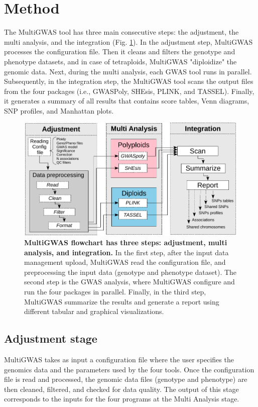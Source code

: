 \documentclass{article}
\begin{document}
\section{Method}

The MultiGWAS tool has three main consecutive steps: the adjustment, the multi analysis, and the integration (Fig. \ref{fig: Pipeline}). In the adjustment step, MultiGWAS processes the configuration file. Then it cleans and filters the genotype and phenotype datasets, and in case of tetraploids,  MultiGWAS "diploidize" the genomic data. Next, during the multi analysis, each GWAS tool runs in parallel. Subsequently, in the integration step, the MultiGWAS tool scans the output files from the four packages (i.e., GWASPoly, SHEsis, PLINK, and TASSEL). Finally, it generates a summary of all results that contains score tables, Venn diagrams, SNP profiles, and Manhattan plots. 
\begin{figure}
\centering{}\includegraphics[width=12cm]{02_figure-multiGWAS-flowchart-stages} \caption{\textbf{MultiGWAS flowchart has three steps: adjustment, multi analysis, and integration.} In the first step, after the input data management upload, MultiGWAS read the configuration file, and preprocessing the input data (genotype and phenotype dataset). The second step is the GWAS analysis, where MultiGWAS configure and run the four packages in parallel. Finally, in the third step, MultiGWAS summarize the results and generate a report using different tabular and graphical visualizations.\label{fig: Pipeline}}
\end{figure}

\subsection{Adjustment stage}

MultiGWAS takes as input a configuration file where the user specifies the genomics data and the parameters used by the four tools. Once the configuration file is read and processed, the genomic data files (genotype and phenotype) are then cleaned, filtered, and checked for data quality. The output of this stage corresponds to the inputs for the four programs at the Multi Analysis stage.
\end{document}
